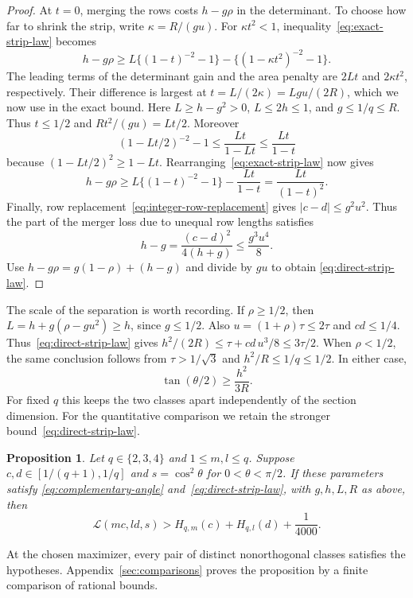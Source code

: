 \documentclass[11pt,a4paper]{article}
\newtheorem{proposition}[theorem]{Proposition}
\theoremstyle{remark}\newtheorem{remark}[theorem]{Remark}
\numberwithin{equation}{section}
\begin{document}
\begin{proof}
At \(t=0\), merging the rows costs \(h-g\rho\) in the determinant.
To choose how far to shrink the strip, write \(\kappa=R/(gu)\).
For \(\kappa t^2<1\), inequality~\eqref{eq:exact-strip-law} becomes
\[
 h-g\rho\ge L\{(1-t)^{-2}-1\}-\{(1-\kappa t^2)^{-2}-1\}.
\]
The leading terms of the determinant gain and the area penalty are
\(2Lt\) and \(2\kappa t^2\), respectively. Their difference is
largest at \(t=L/(2\kappa)=Lgu/(2R)\), which we now use in the
exact bound.
Here \(L\ge h-g^2>0\), \(L\le 2h\le1\), and \(g\le1/q\le R\).
Thus \(t\le1/2\)
and \(Rt^2/(gu)=Lt/2\). Moreover
\[
 (1-Lt/2)^{-2}-1\le\frac{Lt}{1-Lt}\le\frac{Lt}{1-t}
\]
because \((1-Lt/2)^2\ge1-Lt\). Rearranging~\eqref{eq:exact-strip-law}
now gives
\[
 h-g\rho\ge L\{(1-t)^{-2}-1\}-\frac{Lt}{1-t}
          =\frac{Lt}{(1-t)^2}.
\]
Finally, row replacement~\eqref{eq:integer-row-replacement} gives
\(|c-d|\le g^2u^2\). Thus the part of the merger loss due to unequal
row lengths satisfies
\[
 h-g=\frac{(c-d)^2}{4(h+g)}\le\frac{g^3u^4}{8}.
\]
Use \(h-g\rho=g(1-\rho)+(h-g)\) and divide by \(gu\) to obtain
\eqref{eq:direct-strip-law}.
\end{proof}

The scale of the separation is worth recording. If \(\rho\ge1/2\),
then \(L=h+g(\rho-gu^2)\ge h\), since \(g\le1/2\). Also
\(u=(1+\rho)\tau\le2\tau\) and \(cd\le1/4\).
Thus~\eqref{eq:direct-strip-law} gives
\(h^2/(2R)\le\tau+cd\,u^3/8\le 3\tau/2\).
When \(\rho<1/2\), the same conclusion follows from
\(\tau>1/\sqrt3\) and \(h^2/R\le1/q\le1/2\). In either case,
\[
 \tan(\theta/2)\ge\frac{h^2}{3R}.
\]
For fixed \(q\) this keeps the two classes apart independently of the
section dimension. For the quantitative comparison we retain the
stronger bound~\eqref{eq:direct-strip-law}.

\begin{proposition}\label{prop:edge-pay}
Let \(q\in\{2,3,4\}\) and \(1\le m,l\le q\).
Suppose \(c,d\in[1/(q+1),1/q]\) and \(s=\cos^2\theta\) for
\(0<\theta<\pi/2\). If these parameters satisfy
\eqref{eq:complementary-angle} and~\eqref{eq:direct-strip-law},
with \(g,h,L,R\) as above, then
\[
 \mathcal L(mc,ld,s)>H_{q,m}(c)+H_{q,l}(d)+\frac1{4000}.
\]
\end{proposition}
At the chosen maximizer, every pair of distinct nonorthogonal classes
satisfies the hypotheses. Appendix~\ref{sec:comparisons} proves the
proposition by a finite comparison of rational bounds.
\end{document}
